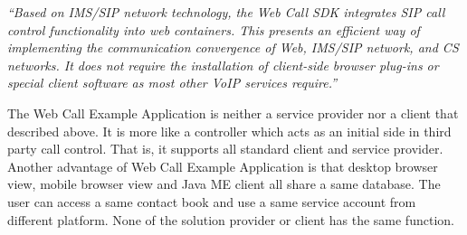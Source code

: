 \textit{``Based on IMS/SIP network technology, the Web Call SDK integrates SIP call control functionality into web containers. This presents an efficient way of implementing the communication convergence of Web, IMS/SIP network, and CS networks. It does not require the installation of client-side browser plug-ins or special client software as most other VoIP services require.''} \cite{WebCallSDK}

The Web Call Example Application is neither a service provider nor a client that described above. It is more like a controller which acts as an initial side in third party call control. That is, it supports all standard client and service provider. Another advantage of Web Call Example Application is that desktop browser view, mobile browser view and Java ME client all share a same database. The user can access a same contact book and use a same service account from different platform. None of the solution provider or client has the same function.







